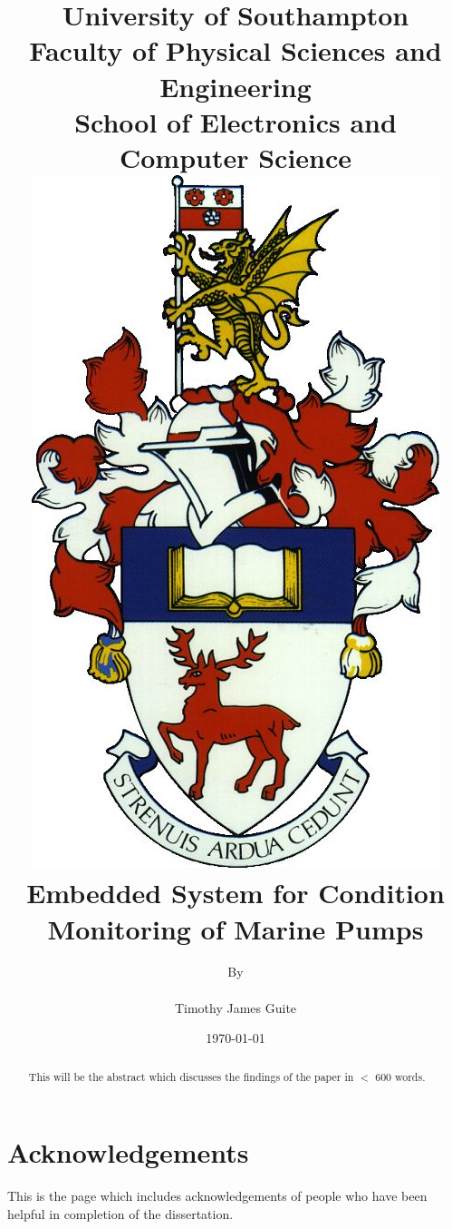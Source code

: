\documentclass[12pt]{report}
\title{
	{\small University of Southampton}\\
	{\small Faculty of Physical Sciences and Engineering}\\
	{\small School of Electronics and Computer Science}\\
	[2cm]
	{\includegraphics{Images/coat_of_arms.jpg}}\\[2cm]
	\textbf{{Embedded System for Condition Monitoring of Marine Pumps}}
}
\author{By\\ \\
	Timothy James Guite}
\date{\today}
\begin{document}
\maketitle
%
\maketitle

\begin{abstract}

This will be the abstract which discusses the findings of the paper in $<$ 600 words.

\end{abstract}

\chapter*{Acknowledgements}
This is the page which includes acknowledgements of people who have been helpful in completion of the dissertation.

\tableofcontents

\listoffigures


\end{document}
